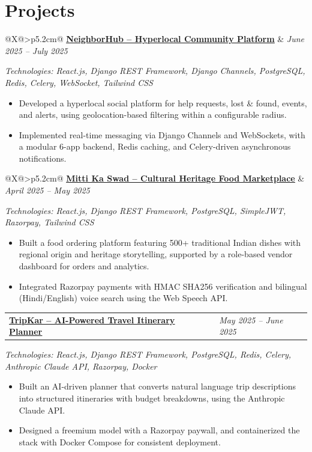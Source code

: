 \documentclass[10pt, a4paper]{article}
\makeatletter
\newcommand{\entrytwo}[2]{%
  \noindent
  \begin{tabularx}{\linewidth}{@{}X@{\hspace{4pt}}>{\raggedleft\arraybackslash}p{5.2cm}@{}}
    #1 & \textit{#2}
  \end{tabularx}%
}
\newcommand{\projheading}[3]{%
  \entrytwo{\href{#2}{\underline{\textbf{#1}}}}{#3}%
}
\makeatother
\begin{document}
\section*{Projects}

\projheading{NeighborHub -- Hyperlocal Community Platform}{https://github.com/manish780386/NeighborHub}{June 2025 -- July 2025}
\textit{Technologies: React.js, Django REST Framework, Django Channels, PostgreSQL, Redis, Celery, WebSocket, Tailwind CSS}
\begin{itemize}
  \item Developed a hyperlocal social platform for help requests, lost \& found, events, and alerts, using geolocation-based filtering within a configurable radius.
  \item Implemented real-time messaging via Django Channels and WebSockets, with a modular 6-app backend, Redis caching, and Celery-driven asynchronous notifications.
\end{itemize}

\vspace{2pt}

\projheading{Mitti Ka Swad -- Cultural Heritage Food Marketplace}{https://github.com/manish780386/Miiti-Ka-Swwad}{April 2025 -- May 2025}
\textit{Technologies: React.js, Django REST Framework, PostgreSQL, SimpleJWT, Razorpay, Tailwind CSS}
\begin{itemize}
  \item Built a food ordering platform featuring 500+ traditional Indian dishes with regional origin and heritage storytelling, supported by a role-based vendor dashboard for orders and analytics.
  \item Integrated Razorpay payments with HMAC SHA256 verification and bilingual (Hindi/English) voice search using the Web Speech API.
\end{itemize}

\vspace{2pt}

\projheading{TripKar -- AI-Powered Travel Itinerary Planner}{https://github.com/manish780386/TRIPKAR}{May 2025 -- June 2025}
\textit{Technologies: React.js, Django REST Framework, PostgreSQL, Redis, Celery, Anthropic Claude API, Razorpay, Docker}
\begin{itemize}
  \item Built an AI-driven planner that converts natural language trip descriptions into structured itineraries with budget breakdowns, using the Anthropic Claude API.
  \item Designed a freemium model with a Razorpay paywall, and containerized the stack with Docker Compose for consistent deployment.
\end{itemize}
\end{document}
